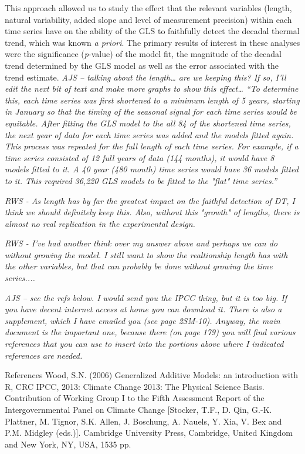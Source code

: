 \documentclass{ametsoc}
\begin{document}
This approach allowed us to study the effect that the relevant variables (length, natural variability, added slope and level of measurement precision) within each time series have on the ability of the GLS to faithfully detect the decadal thermal trend, which was known \emph{a priori}. The primary results of interest in these analyses were the significance (\emph{p}-value) of the model fit, the magnitude of the decadal trend determined by the GLS model as well as the error associated with the trend estimate. \emph{AJS – talking about the length… are we keeping this? If so, I’ll edit the next bit of text and make more graphs to show this effect… “To determine this, each time series was first shortened to a minimum length of 5 years, starting in January so that the timing of the seasonal signal for each time series would be equitable. After fitting the GLS model to the all 84 of the shortened time series, the next year of data for each time series was added and the models fitted again. This process was repeated for the full length of each time series. For example, if a time series consisted of 12 full years of data (144 months), it would have 8 models fitted to it. A 40 year (480 month) time series would have 36 models fitted to it. This required 36,220 GLS models to be fitted to the "flat" time series.”}

\emph{RWS - As length has by far the greatest impact on the faithful detection of DT, I think we should definitely keep this. Also, without this "growth" of lengths, there is almost no real replication in the experimental design.}

\emph{RWS - I've had another think over my answer above and perhaps we can do without growing the model. I still want to show the realtionship length has with the other variables, but that can probably be done without growing the time series....}

\emph{AJS – see the refs below. I would send you the IPCC thing, but it is too big. If you have decent internet access at home you can download it. There is also a supplement, which I have emailed you (see page 2SM-10). Anyway, the main document is the important one, because there (on page 179) you will find various references that you can use to insert into the portions above where I indicated references are needed.}

References
Wood, S.N. (2006) Generalized Additive Models: an introduction with R, CRC
IPCC, 2013: Climate Change 2013: The Physical Science Basis. Contribution of Working Group I to the Fifth Assessment Report of the Intergovernmental Panel on Climate Change [Stocker, T.F., D. Qin, G.-K. Plattner, M. Tignor, S.K. Allen, J. Boschung, A. Nauels, Y. Xia, V. Bex and P.M. Midgley (eds.)]. Cambridge University Press, Cambridge, United Kingdom and New York, NY, USA, 1535 pp.
\end{document}
